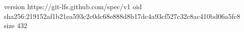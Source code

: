 version https://git-lfs.github.com/spec/v1
oid sha256:219152af1b21ea593c2c0dc68e888d8b17dc4a93cf527c32c8ac410bd06a5fc8
size 432
